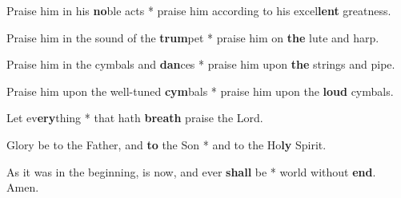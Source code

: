 \begin{multicols}{2}
	Praise him in his \textbf{no}ble acts * praise him according to his excel\textbf{lent} greatness.
	
	Praise him in the sound of the \textbf{trum}pet * praise him on \textbf{the} lute and harp.
	
	Praise him in the cymbals and \textbf{dan}ces * praise him upon \textbf{the} strings and pipe.
	
	Praise him upon the well-tuned \textbf{cym}bals * praise him upon the \textbf{loud} cymbals.
	
	Let ev\textbf{ery}thing * that hath \textbf{breath} praise the Lord.
	
	Glory be to the Father, and \textbf{to} the Son * and to the Ho\textbf{ly} Spirit.
	
	As it was in the beginning, is now, and ever \textbf{shall} be * world without \textbf{end}. Amen.
\end{multicols}